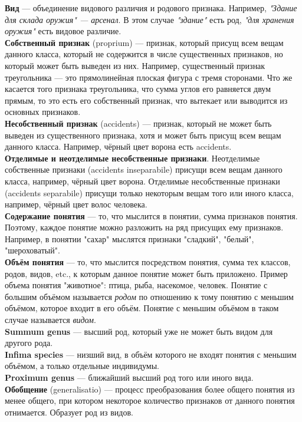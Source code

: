 \documentclass{article}
\begin{document}
\textbf{Вид} --- объединение видового различия и родового признака. Например, \textit{"Здание для склада оружия" --- арсенал}. В этом случае \textit{"здание"} есть род, \textit{"для хранения оружия"} есть видовое различие.
\\
\textbf{Собственный признак} (proprium) --- признак, который присущ всем вещам данного класса, который не содержится в числе существенных признаков, но который может быть выведен из них. Например, существенный признак треугольника --- это прямолинейная плоская фигура с тремя сторонами. Что же касается того признака треугольника, что сумма углов его равняется двум прямым, то это есть его собственный признак, что вытекает или выводится из основных признаков.
\\
\textbf{Несобственный признак} (accidents) --- признак, который не может быть выведен из существенного признака, хотя и может быть присущ всем вещам данного класса. Например, чёрный цвет ворона есть accidents. 
\\
\textbf{Отделимые и неотделимые несобственные признаки}. Неотделимые собственные признаки (accidents inseparabile) присущи всем вещам данного класса, например, чёрный цвет ворона. Отделимые несобственные признаки (accidents separabile) присущи только некоторым вещам того или иного класса, например, чёрный цвет волос человека.
\\
\textbf{Содержание понятия} --- то, что мыслится в понятии, сумма признаков понятия. Поэтому, каждое понятие можно разложить на ряд присущих ему признаков. Например, в понятии "сахар" мыслятся признаки "сладкий", "белый", "шероховатый".
\\
\textbf{Объём понятия} --- то, что мыслится посредством понятия, сумма тех классов, родов, видов, etc., к которым данное понятие может быть приложено. Пример объема понятия "животное": птица, рыба, насекомое, человек. Понятие с большим объёмом называется \textit{родом} по отношению к тому понятию с меньшим объёмом, которое входит в его объём. Понятие с меньшим объёмом в таком случае называется \textit{видом}.
\\
\textbf{Summum genus} --- высший род, который уже не может быть видом для другого рода.
\\
\textbf{Infima species} --- низший вид, в объём которого не входят понятия с меньшим объёмом, а только отдельные индивидумы.
\\
\textbf{Proximum genus} --- ближайший высший род того или иного вида.
\\
\textbf{Обобщение} (generalisatio) --- процесс преобразования более общего понятия из менее общего, при котором некоторое количество признаков от данного понятия отнимается. Образует род из видов.
\end{document}
